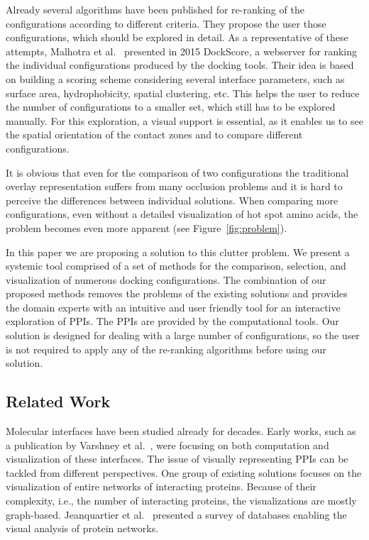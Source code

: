 \documentclass{bmcart}
\begin{document}
Already several algorithms have been published for re-ranking of the configurations according to different criteria.
They propose the user those configurations, which should be explored in detail.
As a representative of these attempts, Malhotra et al.~\cite{Malhotra2015} presented in 2015 DockScore, a webserver for ranking the individual configurations produced by the docking tools. 
Their idea is based on building a scoring scheme considering several interface parameters, such as surface area, hydrophobicity, spatial clustering, etc.
This helps the user to reduce the number of configurations to a smaller set, which still has to be explored manually.
For this exploration, a visual support is essential, as it enables us to see the spatial orientation of the contact zones and to compare different configurations.

It is obvious that even for the comparison of two configurations the traditional overlay representation suffers from many occlusion problems and it is hard to perceive the differences between individual solutions.
When comparing more configurations, even without a detailed visualization of hot spot amino acids, the problem becomes even more apparent (see Figure~\ref{fig:problem}).

In this paper we are proposing a solution to this clutter problem.
We present a systemic tool comprised of a set of methods for the comparison, selection, and visualization of numerous docking configurations.
The combination of our proposed methods removes the problems of the existing solutions and provides the domain experts with an intuitive and user friendly tool for an interactive exploration of PPIs.
The PPIs are provided by the computational tools.
Our solution is designed for dealing with a large number of configurations, so the user is not required to apply any of the re-ranking algorithms before using our solution. 

\subsection*{Related Work}
Molecular interfaces have been studied already for decades. 
Early works, such as a publication by Varshney et al.~\cite{Varshney2003}, were focusing on both computation and visualization of these interfaces.
The issue of visually representing PPIs can be tackled from different perspectives.
One group of existing solutions focuses on the visualization of entire networks of interacting proteins.
Because of their complexity, i.e., the number of interacting proteins, the visualizations are mostly graph-based.
Jeanquartier et al.~\cite{Jeanquartier2015} presented a survey of databases enabling the visual analysis of protein networks.
\end{document}

